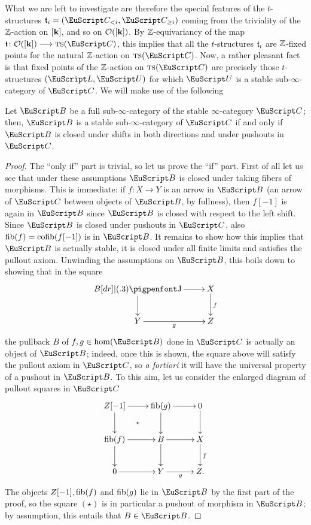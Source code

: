 What we are left to investigate are therefore the special features of the $t$-structures $\tee_{i}=(\C_{< i},\C_{\geq i})$ coming from the triviality of the $\mathbb{Z}$-action on $[\mathbf{k}]$, and so on $\mathcal{O}([\mathbf{k}])$.
By $\mathbb{Z} $-equivariancy of the map $\tee\colon \mathcal{O}(\ordered{k})\to \ts(\C)$, this implies that all the $t$-structures $\mathfrak{t}_{i}$ are $\mathbb{Z} $-fixed points for the natural $\mathbb{Z} $-action on $ \ts(\C)$. Now, a rather pleasant fact is that fixed points of the $\mathbb{Z}$-action on $\ts(\C)$ are precisely those $t$-structures $(\cate{L}, \cate{U})$ for which $\cate{U}$ is a stable sub-$\infty$-category of $\C$. We will make use of the following
\begin{lemma}\label{magicstable}
Let $\cB$ be a full sub-$\infty$-category of the stable $\infty$-category $\C$; then, $\cB$ is a stable sub-$\infty$-category of $\C$ if and only if $\cB$ is closed under shifts in both directions and under pushouts in $\C$.
\end{lemma}
\begin{proof}
The ``only if'' part is trivial, so let us prove the ``if'' part.
First of all let us see that under these assumptions $\cB$ is closed under taking fibers of morphisms. This is immediate: if $f\colon X\to Y$ is an arrow in $\cB$ (\ie an arrow of $\C$ between objects of $\cB$, by fullness), then $f[-1]$ is again in $\cB$ since $\cB$ is closed with respect to the left shift. Since $\cB$ is closed under pushouts in $\C$, also  $\operatorname{fib}(f)=\operatorname{cofib}(f[-1])$ is in $\cB$. It remains to show how this implies that $\cB$ is actually stable, \ie it is closed under all finite limits and satisfies the pullout axiom. Unwinding the assumptions on $\cB$, this boils down to showing that in the square
\[
\xymatrix{
B \ar[r]\ar[d] \pb &  X\ar[d]^f \\
Y \ar[r]_g& Z
}
\]
the pullback $B$ of $f,g \in \hom(\cB)$ done in $\C$ is actually an object of $\cB$; indeed, once this is shown, the square above will satisfy the pullout axiom in $\C$, 
so \emph{a fortiori} it will have the universal property of a pushout in $\cB$. To this aim, let us consider the enlarged diagram of pullout squares in $\C$
\[
\xymatrix{
Z[-1]\ar[r]\ar[d] \ar@{}[dr]|\star & \fib(g)\ar[r]\ar[d] & 0\ar[d] \\
\fib(f)\ar[r]\ar[d] & B\ar[r]\ar[d] & X \ar[d]^f\\
0\ar[r] & Y \ar[r]_g & Z.
}
\]
The objects $Z[-1], \operatorname{fib}(f)$ and $\operatorname{fib}(g)$ lie in $\cB$ by the first part of the proof, so the square $(\star)$ is in particular a pushout of morphism in $\cB$; by assumption, this entails that $B\in\cB$.
\end{proof}
